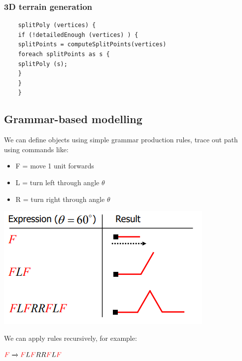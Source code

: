 \documentclass[11pt]{article}
\begin{document}
  \subsubsection{3D terrain generation}

  \lstset{language=Java}

  \begin{lstlisting}
    splitPoly (vertices) {
    if (!detailedEnough (vertices) ) {
    splitPoints = computeSplitPoints(vertices)
    foreach splitPoints as s {
    splitPoly (s);
    }
    }
    }
  \end{lstlisting}
  \newpage
  \subsection{Grammar-based modelling}
  We can define objects using simple grammar
  production rules, trace out path using commands like:\\

  \begin{minipage}[c]{0.45\textwidth}
    \begin{itemize}
      \item F = move 1 unit forwards
      \item L = turn left through angle $\theta$
      \item R = turn right through angle $\theta$
    \end{itemize}
  \end{minipage}
  \hfill
  \begin{minipage}[c]{0.55\textwidth}
    \includegraphics[scale=0.7]{grammar_based}

  \end{minipage}

  We can apply rules recursively, for example:\\

  \begin{center}
    $\textcolor{red}{F} \xrightarrow{} \textcolor{red}{F}L\textcolor{red}{F}RR\textcolor{red}{F}L\textcolor{red}{F}$
  \end{center}
\end{document}
